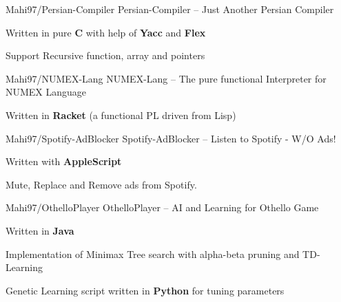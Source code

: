 \begin{cventries}
  \cventry
    {Mahi97/Persian-Compiler} %
    {Persian-Compiler -- Just Another Persian Compiler} %
    {} %
    {} %
    {
      \begin{cvitems} %
        \item {Written in pure \textbf{C} with help of \textbf{Yacc} and \textbf{Flex}}
        \item {Support Recursive function, array and pointers}
      \end{cvitems}
    }
        \newline

  \cventry
    {Mahi97/NUMEX-Lang} %
    {NUMEX-Lang -- The pure functional Interpreter for NUMEX Language} %
    {} %
    {} %
    {
      \begin{cvitems} %
        \item {Written in \textbf{Racket} (a functional PL driven from Lisp)}
      \end{cvitems}
    }
        \newline

  \cventry
    {Mahi97/Spotify-AdBlocker} %
    {Spotify-AdBlocker -- Listen to Spotify - W/O Ads!} %
    {} %
    {} %
    {
      \begin{cvitems} %
        \item {Written with \textbf{AppleScript}}
        \item {Mute, Replace and Remove ads from Spotify.}
      \end{cvitems}
    }
    \newline
\cventry
    {Mahi97/OthelloPlayer} %
    {OthelloPlayer -- AI and Learning for Othello Game} %
    {} %
    {} %
    {
      \begin{cvitems} %
        \item {Written in \textbf{Java}}
        \item {Implementation of Minimax Tree search with alpha-beta pruning and TD-Learning}
        \item {Genetic Learning script written in \textbf{Python} for tuning parameters}
      \end{cvitems}
    }


\end{cventries}
